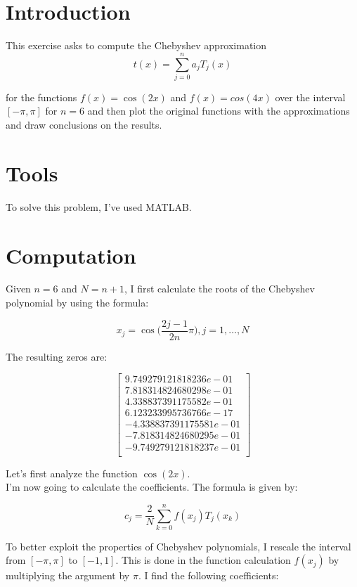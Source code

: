 \documentclass{article}
\begin{document}
\section{Introduction}\label{sec:intro}
This exercise asks to compute the Chebyshev approximation
$$t(x)=\sum^n_{j=0}{a_jT_j(x)}$$

for the functions $f(x)=\cos(2x)$ and $f(x)=cos(4x)$ over the interval $[-\pi,\pi]$ for $n = 6$ and then plot the original functions with the approximations and draw conclusions on the results.


\section{Tools}
To solve this problem, I've used MATLAB.

\section{Computation}
Given $n=6$ and $N=n+1$, I first calculate the roots of the Chebyshev polynomial by using the formula:

$$x_j=\cos \Big( \frac{2j-1}{2n}\pi \Big), j=1,\dots,N$$

The resulting zeros are:

$$
\begin{bmatrix} 
9.749279121818236e-01\\
7.818314824680298e-01\\
4.338837391175582e-01\\
6.123233995736766e-17\\
-4.338837391175581e-01\\
-7.818314824680295e-01\\
-9.749279121818237e-01\\
\end{bmatrix}
$$

Let's first analyze the function $\cos(2x)$.\\

I'm now going to calculate the coefficients. The formula is given by:

$$c_j=\frac{2}{N}\sum_{k=0}^{n}f(x_j)T_j(x_k)$$

To better exploit the properties of Chebyshev polynomials, I rescale the interval from $[-\pi,\pi]$ to $[-1,1]$. This is done in the function calculation $f(x_j)$ by multiplying the argument by $\pi$. I find the following coefficients:
\end{document}
